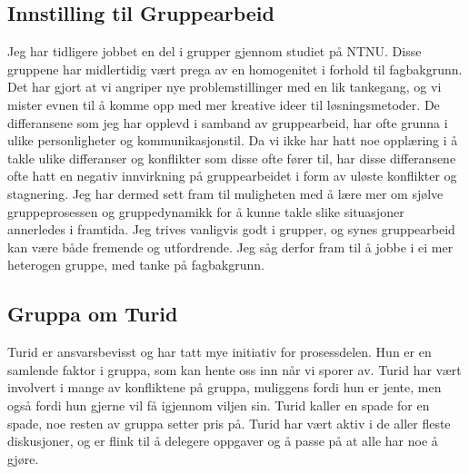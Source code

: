 \subsection*{Innstilling til Gruppearbeid}
Jeg har tidligere jobbet en del i grupper gjennom studiet på NTNU. Disse gruppene har midlertidig vært prega av en homogenitet i forhold til fagbakgrunn. Det har gjort at vi angriper nye problemstillinger med en lik tankegang, og vi mister evnen til å komme opp med mer kreative ideer til løsningsmetoder. De differansene som jeg har opplevd i samband av gruppearbeid, har ofte grunna i ulike personligheter og kommunikasjonstil. Da vi ikke har hatt noe opplæring i å takle ulike differanser og konflikter som disse ofte fører til, har disse differansene ofte hatt en negativ innvirkning på gruppearbeidet i form av uløste konflikter og stagnering. Jeg har dermed sett fram til muligheten med å lære mer om sjølve gruppeprosessen og gruppedynamikk for å kunne takle slike situasjoner annerledes i framtida. Jeg trives vanligvis godt i grupper, og synes gruppearbeid kan være både fremende og utfordrende.  Jeg såg derfor fram til å jobbe i ei mer heterogen gruppe, med tanke på fagbakgrunn.


%

\subsection*{Gruppa om Turid}
Turid er ansvarsbevisst og har tatt mye initiativ for prosessdelen. Hun er en
samlende faktor i gruppa, som kan hente oss inn når vi sporer av. Turid har vært
involvert i mange av konfliktene på gruppa, muliggens fordi hun er jente,
men også fordi hun gjerne vil få igjennom viljen sin. Turid kaller en spade for
en spade, noe resten av gruppa setter pris på. Turid har vært aktiv i de aller
fleste diskusjoner, og er flink til å delegere oppgaver og å passe på at alle
har noe å gjøre.

